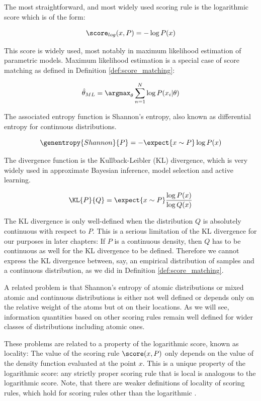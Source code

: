 The most straightforward, and most widely used scoring rule is the logarithmic score which is of the form:

\begin{equation}
	\score_{log}(x,P) = - \log P(x) 
\end{equation}

This score is widely used, most notably in maximum likelihood estimation of parametric models. Maximum likelihood estimation is a special case of score matching as defined in Definition \ref{def:score_matching}:


\begin{equation}
	\hat{\theta}_{ML} = \argmax_{\theta} \sum_{n=1}^{N} \log P(x_i \vert \theta)
\end{equation}


The associated entropy function is Shannon's entropy, also known as differential entropy for continuous distributions.

\begin{equation}
	\genentropy{Shannon}{P} = - \expect{x\sim P} \log P(x)
\end{equation}

The divergence function is the Kullback-Leibler (KL) divergence, which is very widely used in approximate Bayesian inference, model selection and active learning.

\begin{equation}
	\KL{P}{Q} = \expect{x\sim P} \frac{\log P(x)}{\log Q(x)}
\end{equation}

The KL divergence is only well-defined when the distribution $Q$ is absolutely continuous with respect to $P$. This is a serious limitation of the KL divergence for our purposes in later chapters: If $P$ is a continuous density, then $Q$ has to be continuous as well for the KL divergence to be defined. Therefore we cannot express the KL divergence between, say, an empirical distribution of samples and a continuous distribution, as we did in Definition \ref{def:score_matching}.

A related problem is that Shannon's entropy of atomic distributions or mixed atomic and continuous distributions is either not well defined or depends only on the relative weight of the atoms but ot on their locations. As we will see, information quantities based on other scoring rules remain well defined for wider classes of distributions including atomic ones.

These problems are related to a property of the logarithmic score, known as locality: The value of the scoring rule $\score(x,P)$ only depends on the value of the density function evaluated at the point $x$. This is a unique property of the logarithmic score: any strictly proper scoring rule that is local is analogous to the logarithmic score. Note, that there are weaker definitions of locality of scoring rules, which hold for scoring rules other than the logarithmic \citep{Parry2012, Dawid2012}.

